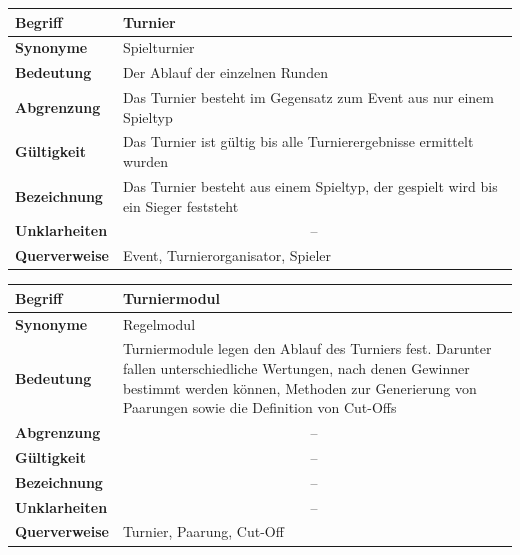\documentclass[11pt]{article}
\begin{document}
\begin{tabularx}{\textwidth}{| p{} | p{} |}
	\hline
	\textbf{Begriff} & Turnier\\
	\hline
	\textbf{Synonyme} & Spielturnier \\
	\hline
	\textbf{Bedeutung} & Der Ablauf der einzelnen Runden\\
	\hline
	\textbf{Abgrenzung} & Das Turnier besteht im Gegensatz zum Event aus nur einem Spieltyp\\
	\hline
	\textbf{Gültigkeit} & Das Turnier ist gültig bis alle Turnierergebnisse ermittelt wurden\\
	\hline
	\textbf{Bezeichnung} & Das Turnier besteht aus einem Spieltyp, der gespielt wird bis ein Sieger feststeht\\
	\hline
	\textbf{Unklarheiten} & \multicolumn{1}{c|}{--} \\
	\hline
	\textbf{Querverweise} & Event, Turnierorganisator, Spieler \\
	\hline
\end{tabularx}

\newpage

\begin{tabularx}{\textwidth}{| p{} | p{} |}
	\hline
	\textbf{Begriff} & Turniermodul\\
	\hline
	\textbf{Synonyme} & Regelmodul\\
	\hline
	\textbf{Bedeutung} & Turniermodule legen den Ablauf des Turniers fest. Darunter fallen unterschiedliche Wertungen, nach denen Gewinner bestimmt werden können, Methoden zur Generierung von Paarungen sowie die Definition von Cut-Offs\\
	\hline
	\textbf{Abgrenzung} & \multicolumn{1}{c|}{--} \\
	\hline
	\textbf{Gültigkeit} & \multicolumn{1}{c|}{--} \\
	\hline
	\textbf{Bezeichnung} & \multicolumn{1}{c|}{--} \\
	\hline
	\textbf{Unklarheiten} & \multicolumn{1}{c|}{--} \\
	\hline
	\textbf{Querverweise} & Turnier, Paarung, Cut-Off\\
	\hline
\end{tabularx}
\end{document}
